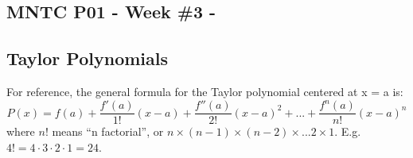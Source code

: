 





\begin{center}
\subsection*{MNTC P01 - Week \#3 - \WeekTitleThree}
\end{center}

\subsection*{Taylor Polynomials}

For reference, the general formula for the Taylor polynomial centered at x = a is:
\[P(x) = f(a) + \frac{f'(a)}{1!} (x-a) + \frac{f''(a)}{2!} (x-a)^2 + ... + \frac{f^n(a)}{n!} (x-a)^n\]
where $n!$ means ``n factorial'', or $n \times (n-1) \times (n-2) \times ... 2 \times 1$.  E.g. $4! = 4 \cdot 3 \cdot 2 \cdot 1 = 24$.

